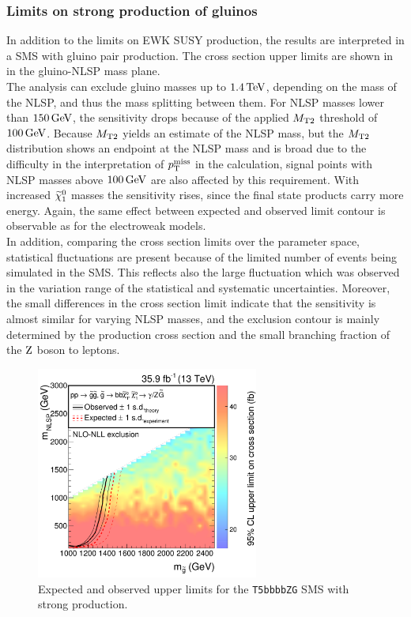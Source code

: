 \subsubsection*{Limits on strong production of gluinos}
In addition to the limits on EWK SUSY production, the results are interpreted in a SMS with gluino pair production. The cross section upper limits are shown in  in the gluino-NLSP mass plane.\\
The analysis can exclude gluino masses up to $1.4\,\text{Te\hspace{-.08em}V}$, depending on the mass of the NLSP, and thus the mass splitting between them. For NLSP masses lower than $150\,\text{Ge\hspace{-.08em}V}$, the sensitivity drops because of the applied $M_{\mathrm{T2}}$ threshold of $100\,\text{Ge\hspace{-.08em}V}$. Because $M_{\mathrm{T2}}$ yields an estimate of the NLSP mass, but the $M_{\mathrm{T2}}$ distribution shows an endpoint at the NLSP mass and is broad due to the difficulty in the interpretation of $p_{\mathrm{T}}^\text{miss}$ in the calculation, signal points with NLSP masses above $100\,\text{Ge\hspace{-.08em}V}$ are also affected by this requirement. With increased $\widetilde{\chi}^{0}_{1}$ masses the sensitivity rises, since the final state products carry more energy. Again, the same effect between expected and observed limit contour is observable as for the electroweak models.\\
In addition, comparing the cross section limits over the parameter space, statistical fluctuations are present because of the limited number of events being simulated in the SMS. This reflects also the large fluctuation which was observed in the variation range of the statistical and systematic uncertainties. Moreover, the small differences in the cross section limit indicate that the sensitivity is almost similar for varying NLSP masses, and the exclusion contour is mainly determined by the production cross section and the small branching fraction of the $\mathrm{Z}$ boson to leptons.

\begin{figure}[tbp]
 \centering
 \includegraphics[width=0.65\textwidth]{figures/EndorsementPlots/T5bbbbZg_limits_XSEC2}
 \caption{Expected and observed upper limits for the \texttt{T5bbbbZG} SMS with strong production.}
 \label{fig:limitStrong}
\end{figure}
